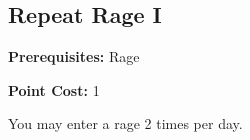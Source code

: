 \subsection{Repeat Rage I}\label{feat:repeatrage1}

\noindent
\textbf{Prerequisites:} Rage

\noindent
\textbf{Point Cost:} 1 

You may enter a rage 2 times per day.
